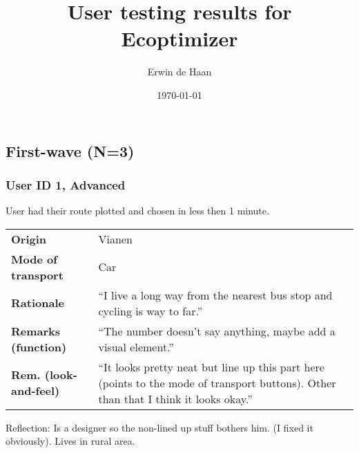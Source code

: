 \documentclass[final,a4paper,11pt]{article}
\author{Erwin de Haan}
\title{User testing results for Ecoptimizer}
\date{\today}
\newlength{\resulttablecolone}
\newlength{\resulttablecoltwo}
\begin{document}
\maketitle

\subsection*{First-wave (N=3)}
\subsubsection*{User ID 1, Advanced}
User had their route plotted and chosen in less then 1 minute.
\begin{table}[H]
\begin{tabular}{p{\resulttablecolone}|p{\resulttablecoltwo}}
\textbf{Origin} & Vianen \\
\textbf{Mode of transport} & Car \\
\textbf{Rationale} & ``I live a long way from the nearest bus stop and cycling is way to far.'' \\
\textbf{Remarks (function)} & ``The number doesn't say anything, maybe add a visual element.'' \\
\textbf{Rem. (look-and-feel)} & ``It looks pretty neat but line up this part here (points to the mode of transport buttons). Other than that I think it looks okay.'' \\
\end{tabular}
\end{table}
Reflection: Is a designer so the non-lined up stuff bothers him. (I fixed it obviously). Lives in rural area.
\end{document}
